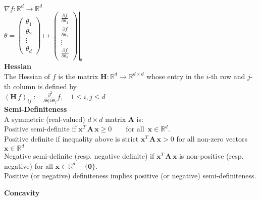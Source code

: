 $\nabla f:\mathbb {R}^ d \rightarrow \mathbb {R}^ d $\\
$\displaystyle \theta =\begin{pmatrix} \theta _1\\ \theta _2\\ \vdots \\ \theta _ d\end{pmatrix} \displaystyle \mapsto \displaystyle \left.\begin{pmatrix}  \frac{\partial f }{\partial \theta _1}\\ \frac{\partial f }{\partial \theta _2}\\ \vdots \\ \frac{\partial f }{\partial \theta _ d}\end{pmatrix}\right|_{\theta }$\\
\textbf{Hessian}\\
The Hessian of $f$ is the matrix $\mathbf{H}: \mathbb {R}^ d \to \mathbb {R}^{d\times d}$ whose entry in the $i$-th row and $j$-th column is defined by\\

$\left(\mathbf{H}\, f\right)_{ij} := \frac{\partial ^2}{\partial \theta _ i \partial \theta _ j} f, \quad 1 \leq i, j \leq d$\\

\textbf{Semi-Definiteness}\\	 	 

A symmetric (real-valued) $d\times d$  matrix $\mathbf{A}$ is:\\

Positive semi-definite if $\mathbf{x}^ T \, \mathbf{A}\, \mathbf{x} \geq 0\qquad \text {for all }\,  \mathbf{x}\in \mathbb {R}^ d.$\\

Positive definite if inequality above is strict $\mathbf{x}^ T \, \mathbf{A}\, \mathbf{x}> 0$ for all non-zero vectors $\mathbf{x}\in \mathbb {R}^ d$\\

Negative semi-definite (resp. negative definite) if $\mathbf{x}^ T \, \mathbf{A}\, \mathbf{x}$ is non-positive (resp. negative) for all $\mathbf{x}\in \mathbb {R}^ d-\{ \mathbf{0}\}$.\\

Positive (or negative) definiteness implies positive (or negative) semi-definiteness.

\textbf{Concavity}\\
	